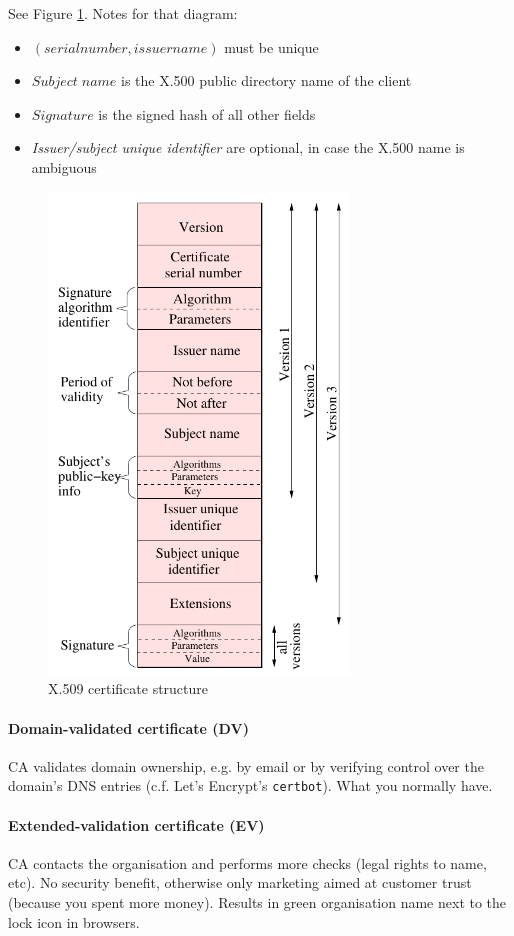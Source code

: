 See Figure \ref{fig:pki-x509-cert}. Notes for that diagram: 
\begin{itemize}
    \item $(serial number, issuer name)$ must be unique
    \item $Subject\; name$ is the X.500 public directory name of the client
    \item $Signature$ is the signed hash of all other fields
    \item \textit{Issuer/subject unique identifier} are optional, in case the X.500 name is ambiguous
\end{itemize}

\begin{figure}[h]
    \centering
    \includegraphics[width=8cm]{images/ch10-pki-x509.png}
    \caption{X.509 certificate structure}
    \label{fig:pki-x509-cert}
\end{figure}

\paragraph{Domain-validated certificate (DV)} CA validates domain ownership, e.g. by email or by verifying control over the domain's DNS entries (c.f. Let's Encrypt's \texttt{certbot}). What you normally have.

\paragraph{Extended-validation certificate (EV)} CA contacts the organisation and performs more checks (legal rights to name, etc). No security benefit, otherwise only marketing aimed at customer trust (because you spent more money). Results in green organisation name next to the lock icon in browsers.


